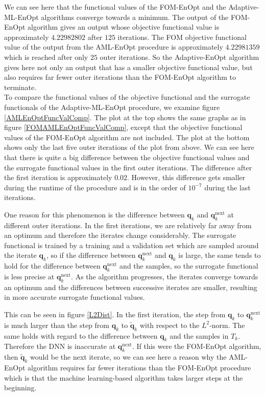 We can see here that the functional values of the FOM-EnOpt and the Adaptive-ML-EnOpt algorithms converge towards a minimum. The output of the FOM-EnOpt algorithm gives an output whose objective functional value is approximately $4.22982802$ after $125$ iterations. The FOM objective functional value of the output from the AML-EnOpt procedure is approximately $4.22981359$ which is reached after only $25$ outer iterations. So the Adaptive-EnOpt algorithm gives here not only an output that has a smaller objective functional value, but also requires far fewer outer iterations than the FOM-EnOpt algorithm to terminate.\\

To compare the functional values of the objective functional and the surrogate functionals of the Adaptive-ML-EnOpt procedure, we examine figure \ref{AMLEnOptFuncValComp}. The plot at the top shows the same graphs as in figure \ref{FOMAMLEnOptFuncValComp}, except that the objective functional values of the FOM-EnOpt algorithm are not included. The plot at the bottom shows only the last five outer iterations of the plot from above. We can see here that there is quite a big difference between the objective functional values and the surrogate functional values in the first outer iterations. The difference after the first iteration is approximately $0.02$. However, this difference gets smaller during the runtime of the procedure and is in the order of $10^{-7}$ during the last iterations.

One reason for this phenomenon is the difference between $\mathbf{q}_k$ and $\mathbf{q}^\mathrm{next}_k$ at different outer iterations. In the first iterations, we are relatively far away from an optimum and therefore the iterates change considerably. The surrogate functional is trained by a training and a validation set which are sampled around the iterate $\mathbf{q}_k$, so  if the difference between $\mathbf{q}^\mathrm{next}_k$ and $\mathbf{q}_k$ is large, the same tends to hold for the difference between $\mathbf{q}^\mathrm{next}_k$ and the samples, so the surrogate functional is less precise at $\mathbf{q}^\mathrm{next}_k$. As the algorithm progresses, the iterates converge towards an optimum and the differences between successive iterates are smaller, resulting in more accurate surrogate functional values.

This can be seen in figure \ref{L2Dist}. In the first iteration, the step from $\mathbf{q}_k$ to $\mathbf{q}^\mathrm{next}_k$ is much larger than the step from $\mathbf{q}_k$ to $\tilde{\mathbf{q}}_k$ with respect to the $L^2$-norm. The same holds with regard to the difference between $\mathbf{q}_k$ and the samples in $T_k$. Therefore the DNN is inaccurate at $\mathbf{q}^\mathrm{next}_k$. If this were the FOM-EnOpt algorithm, then $\tilde{\mathbf{q}}_k$ would be the next iterate, so we can see here a reason why the AML-EnOpt algorithm requires far fewer iterations than the FOM-EnOpt procedure which is that the machine learning-based algorithm takes larger steps at the beginning.

